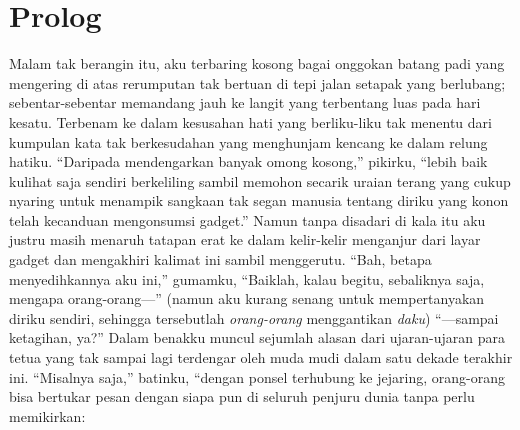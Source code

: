 \documentclass[smalldemyvopaper,11pt,twoside,onecolumn,openright,extrafontsizes]{memoir}
\begin{document}

\chapter*{Prolog}


Malam tak berangin itu, aku terbaring kosong bagai onggokan batang padi yang mengering di atas rerumputan tak bertuan di tepi jalan setapak yang berlubang; sebentar-sebentar memandang jauh ke langit yang terbentang luas pada hari kesatu. Terbenam ke dalam kesusahan hati yang berliku-liku tak menentu dari kumpulan kata tak berkesudahan yang menghunjam kencang ke dalam relung hatiku. ``Daripada mendengarkan banyak omong kosong,'' pikirku, ``lebih baik kulihat saja sendiri berkeliling sambil memohon secarik uraian terang yang cukup nyaring untuk menampik sangkaan tak segan manusia tentang diriku yang konon telah kecanduan mengonsumsi gadget.'' Namun tanpa disadari di kala itu aku justru masih menaruh tatapan erat ke dalam kelir-kelir menganjur dari layar gadget dan mengakhiri kalimat ini sambil menggerutu. ``Bah, betapa menyedihkannya aku ini,'' gumamku, ``Baiklah, kalau begitu, sebaliknya saja, mengapa orang-orang---'' (namun aku kurang senang untuk mempertanyakan diriku sendiri, sehingga tersebutlah \textit{orang-orang} menggantikan \textit{daku}) ``---sampai ketagihan, ya?'' Dalam benakku muncul sejumlah alasan dari ujaran-ujaran para tetua yang tak sampai lagi terdengar oleh muda mudi dalam satu dekade terakhir ini. ``Misalnya saja,'' batinku, ``dengan ponsel terhubung ke jejaring, orang-orang bisa bertukar pesan dengan siapa pun di seluruh penjuru dunia tanpa perlu memikirkan:
\end{document}
